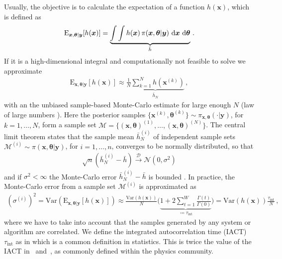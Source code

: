 Usually, the objective is to calculate the expectation of a function $h(\bm{x})$, which is defined as
\begin{align}
	\text{E}_{\bm{x},\bm{\theta}|\bm{y}} [h(\bm{x})] =  \underbrace{\int \int   h(\bm{x}) \,  \pi(\bm{x}, \bm{\theta} | \bm{y} ) \, \mathop{}\!\mathrm{d} \bm{x}  \, \mathop{}\!\mathrm{d} \bm{\theta}}_{\bar{h}}   \label{eq:expPos} \, .
\end{align}
If it is a high-dimensional integral and computationally not feasible to solve we approximate 
\begin{align}
	\label{eq:sampMean}
	\text{E}_{\bm{x},\bm{\theta}|\bm{y}} [h(\bm{x})] \approx \underbrace{ \frac{1}{N} \sum_{k=1}^{N} h(\bm{x}^{(k)})  }_{\bar{h}_N} \, ,
\end{align}
with an the unbiased sample-based Monte-Carlo estimate \cite{roberts2004general} for large enough $N$ (law of large numbers \cite[Chapter 17]{tweedie2009measprob}).
Here the posterior samples $\{\bm{x}^{(k)},\bm{\theta}^{(k)} \}\sim \pi_{\bm{x}, \bm{\theta}}(\cdot|\bm{y})$, for $k = 1, \dots, N$, form a sample set $\mathcal{M} =\{ (\bm{x},\bm{\theta})^{(1)}, \dots ,  (\bm{x},\bm{\theta})^{(N)} \}$.
The central limit theorem states that the sample mean $\bar{h}^{(i)}_N $ of independent sample sets $\mathcal{M}^{(i)}\sim\pi (\bm{x}, \bm{\theta}| \bm{y})$, for $i = 1, \dots, n$, converges to be normally distributed, so that
\begin{align}
	\sqrt{n} (\bar{h}^{(i)}_N -  \bar{h} ) \overset{\mathcal{D}}{\longrightarrow} \mathcal{N} (0,\sigma^2)
\end{align}
and if $\sigma^2 < \infty$ the Monte-Carlo error $\bar{h}^{(i)}_N -  \bar{h} $ is bounded \cite{geyer1992practical}.
In practice, the Monte-Carlo error from a sample set $\mathcal{M}^{(i)}$ is approximated as
\begin{align}
	(\sigma^{(i)})^2  =  \text{Var}(\text{E}_{\bm{x},\bm{\theta}|\bm{y}} [h(\bm{x})]) 
	\approx \frac{\text{Var}(h(\bm{x}) )}{N} \Bigg( \underbrace{  1 + 2 \sum_{t = 1}^{W} \frac{\Gamma(t)}{\Gamma(0)}  }_{ \coloneqq 	\tau_{\text{int}} }\Bigg) = \text{Var}(h(\bm{x})) \frac{ \tau_{\text{int}} }{N} \, , \label{eq:MCerr}
\end{align}
where we have to take into account that the samples generated by any system or algorithm are correlated.
We define the integrated autocorrelation time (IACT) $\tau_{\text{int}}$ as in \cite{fox2016fast} which is a common definition in statistics.
This is twice the value of the IACT in~\cite[pp. 103-105]{wolff2002LecNot} and~\cite{wolff2004monte,drikHesse}, as commonly defined within the physics community.
